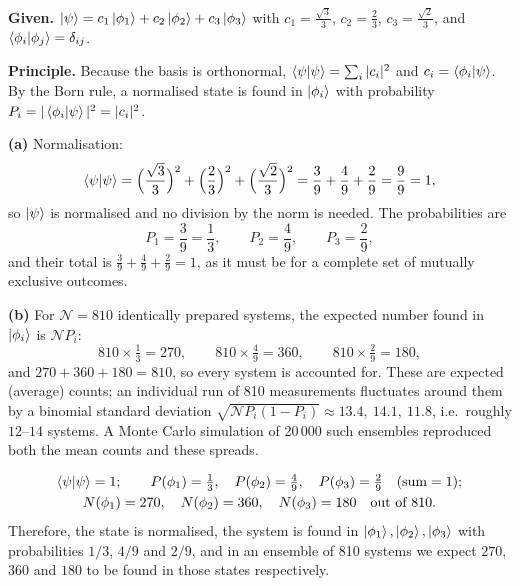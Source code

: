 \documentclass[12pt]{article}
\newif\ifsolutions
\begin{document}
\ifsolutions
\begin{solutionbox}
\textbf{Given.} $\ket{\psi}=c_1\ket{\phi_1}+c_2\ket{\phi_2}+c_3\ket{\phi_3}$ with $c_1=\frac{\sqrt3}{3}$, $c_2=\frac23$, $c_3=\frac{\sqrt2}{3}$, and $\braket{\phi_i|\phi_j}=\delta_{ij}$.

\textbf{Principle.} Because the basis is orthonormal, $\braket{\psi|\psi}=\sum_i|c_i|^2$ and $c_i=\braket{\phi_i|\psi}$. By the Born rule, a normalised state is found in $\ket{\phi_i}$ with probability $P_i=|\braket{\phi_i|\psi}|^2=|c_i|^2$.

\textbf{(a)} Normalisation:
\[
\braket{\psi|\psi}=\Big(\frac{\sqrt3}{3}\Big)^2+\Big(\frac23\Big)^2+\Big(\frac{\sqrt2}{3}\Big)^2=\frac39+\frac49+\frac29=\frac99=1,
\]
so $\ket{\psi}$ is normalised and no division by the norm is needed. The probabilities are
\[
P_1=\frac39=\frac13,\qquad P_2=\frac49,\qquad P_3=\frac29,
\]
and their total is $\frac39+\frac49+\frac29=1$, as it must be for a complete set of mutually exclusive outcomes.

\textbf{(b)} For $\mathcal N=810$ identically prepared systems, the expected number found in $\ket{\phi_i}$ is $\mathcal N P_i$:
\[
810\times\tfrac13=270,\qquad 810\times\tfrac49=360,\qquad 810\times\tfrac29=180,
\]
and $270+360+180=810$, so every system is accounted for. These are expected (average) counts; an individual run of 810 measurements fluctuates around them by a binomial standard deviation $\sqrt{\mathcal N P_i(1-P_i)}\approx13.4,\ 14.1,\ 11.8$, i.e.\ roughly $12$--$14$ systems. A Monte Carlo simulation of 20\,000 such ensembles reproduced both the mean counts and these spreads.
\end{solutionbox}

\begin{answerbox}
\begin{gather*}
\braket{\psi|\psi}=1;\qquad P(\phi_1)=\tfrac13,\quad P(\phi_2)=\tfrac49,\quad P(\phi_3)=\tfrac29\quad(\text{sum}=1);\\
N(\phi_1)=270,\quad N(\phi_2)=360,\quad N(\phi_3)=180\quad\text{out of }810.
\end{gather*}
Therefore, the state is normalised, the system is found in $\ket{\phi_1},\ket{\phi_2},\ket{\phi_3}$ with probabilities $1/3$, $4/9$ and $2/9$, and in an ensemble of 810 systems we expect $270$, $360$ and $180$ to be found in those states respectively.
\end{answerbox}
\end{document}
